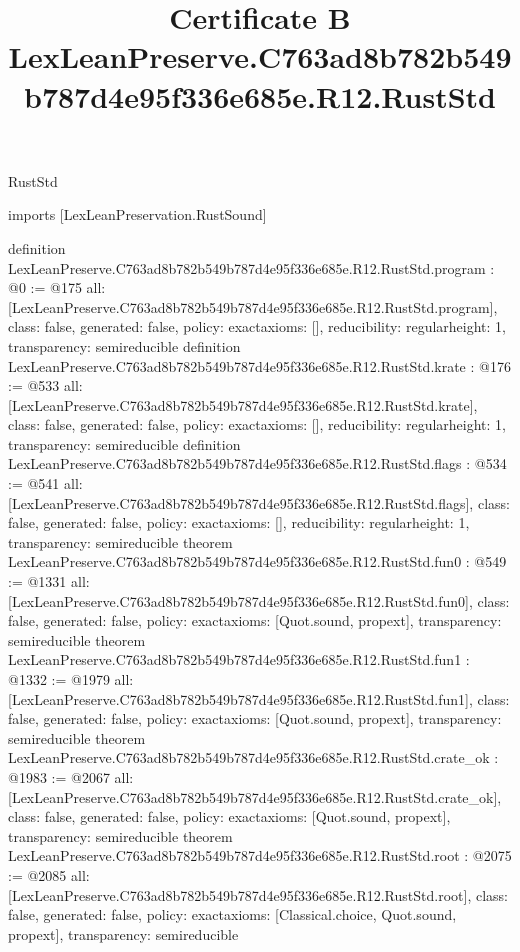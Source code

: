 \begin{lexlean}{RustStd}
\title{Certificate B LexLeanPreserve.C763ad8b782b549b787d4e95f336e685e.R12.RustStd}
\begin{coremodule}
imports [LexLeanPreservation.RustSound]

definition LexLeanPreserve.C763ad8b782b549b787d4e95f336e685e.R12.RustStd.program : @0 := @175 {
  all: [LexLeanPreserve.C763ad8b782b549b787d4e95f336e685e.R12.RustStd.program],
  class: false,
  generated: false,
  policy: exact{axioms: []},
  reducibility: regular{height: 1},
  transparency: semireducible
}
definition LexLeanPreserve.C763ad8b782b549b787d4e95f336e685e.R12.RustStd.krate : @176 := @533 {
  all: [LexLeanPreserve.C763ad8b782b549b787d4e95f336e685e.R12.RustStd.krate],
  class: false,
  generated: false,
  policy: exact{axioms: []},
  reducibility: regular{height: 1},
  transparency: semireducible
}
definition LexLeanPreserve.C763ad8b782b549b787d4e95f336e685e.R12.RustStd.flags : @534 := @541 {
  all: [LexLeanPreserve.C763ad8b782b549b787d4e95f336e685e.R12.RustStd.flags],
  class: false,
  generated: false,
  policy: exact{axioms: []},
  reducibility: regular{height: 1},
  transparency: semireducible
}
theorem LexLeanPreserve.C763ad8b782b549b787d4e95f336e685e.R12.RustStd.fun0 : @549 := @1331 {
  all: [LexLeanPreserve.C763ad8b782b549b787d4e95f336e685e.R12.RustStd.fun0],
  class: false,
  generated: false,
  policy: exact{axioms: [Quot.sound, propext]},
  transparency: semireducible
}
theorem LexLeanPreserve.C763ad8b782b549b787d4e95f336e685e.R12.RustStd.fun1 : @1332 := @1979 {
  all: [LexLeanPreserve.C763ad8b782b549b787d4e95f336e685e.R12.RustStd.fun1],
  class: false,
  generated: false,
  policy: exact{axioms: [Quot.sound, propext]},
  transparency: semireducible
}
theorem LexLeanPreserve.C763ad8b782b549b787d4e95f336e685e.R12.RustStd.crate_ok : @1983 := @2067 {
  all: [LexLeanPreserve.C763ad8b782b549b787d4e95f336e685e.R12.RustStd.crate_ok],
  class: false,
  generated: false,
  policy: exact{axioms: [Quot.sound, propext]},
  transparency: semireducible
}
theorem LexLeanPreserve.C763ad8b782b549b787d4e95f336e685e.R12.RustStd.root : @2075 := @2085 {
  all: [LexLeanPreserve.C763ad8b782b549b787d4e95f336e685e.R12.RustStd.root],
  class: false,
  generated: false,
  policy: exact{axioms: [Classical.choice, Quot.sound, propext]},
  transparency: semireducible
}


\end{coremodule}
\end{lexlean}
